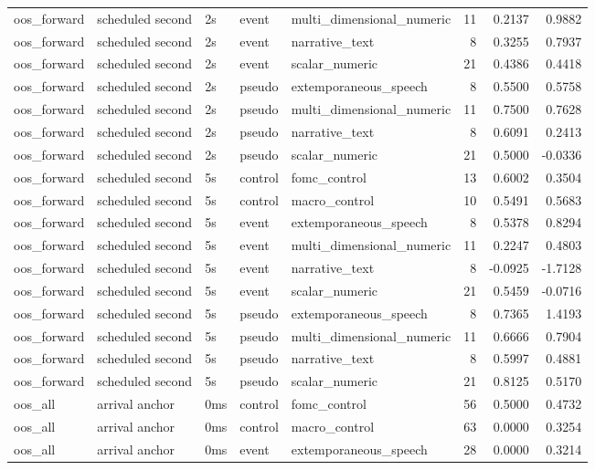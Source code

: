 \begin{tabular}{lllllrrr}
oos_forward & scheduled second & 2s & event & multi_dimensional_numeric & 11 & 0.2137 & 0.9882 \\
oos_forward & scheduled second & 2s & event & narrative_text & 8 & 0.3255 & 0.7937 \\
oos_forward & scheduled second & 2s & event & scalar_numeric & 21 & 0.4386 & 0.4418 \\
oos_forward & scheduled second & 2s & pseudo & extemporaneous_speech & 8 & 0.5500 & 0.5758 \\
oos_forward & scheduled second & 2s & pseudo & multi_dimensional_numeric & 11 & 0.7500 & 0.7628 \\
oos_forward & scheduled second & 2s & pseudo & narrative_text & 8 & 0.6091 & 0.2413 \\
oos_forward & scheduled second & 2s & pseudo & scalar_numeric & 21 & 0.5000 & -0.0336 \\
oos_forward & scheduled second & 5s & control & fomc_control & 13 & 0.6002 & 0.3504 \\
oos_forward & scheduled second & 5s & control & macro_control & 10 & 0.5491 & 0.5683 \\
oos_forward & scheduled second & 5s & event & extemporaneous_speech & 8 & 0.5378 & 0.8294 \\
oos_forward & scheduled second & 5s & event & multi_dimensional_numeric & 11 & 0.2247 & 0.4803 \\
oos_forward & scheduled second & 5s & event & narrative_text & 8 & -0.0925 & -1.7128 \\
oos_forward & scheduled second & 5s & event & scalar_numeric & 21 & 0.5459 & -0.0716 \\
oos_forward & scheduled second & 5s & pseudo & extemporaneous_speech & 8 & 0.7365 & 1.4193 \\
oos_forward & scheduled second & 5s & pseudo & multi_dimensional_numeric & 11 & 0.6666 & 0.7904 \\
oos_forward & scheduled second & 5s & pseudo & narrative_text & 8 & 0.5997 & 0.4881 \\
oos_forward & scheduled second & 5s & pseudo & scalar_numeric & 21 & 0.8125 & 0.5170 \\
oos_all & arrival anchor & 0ms & control & fomc_control & 56 & 0.5000 & 0.4732 \\
oos_all & arrival anchor & 0ms & control & macro_control & 63 & 0.0000 & 0.3254 \\
oos_all & arrival anchor & 0ms & event & extemporaneous_speech & 28 & 0.0000 & 0.3214 \\

\end{tabular}
